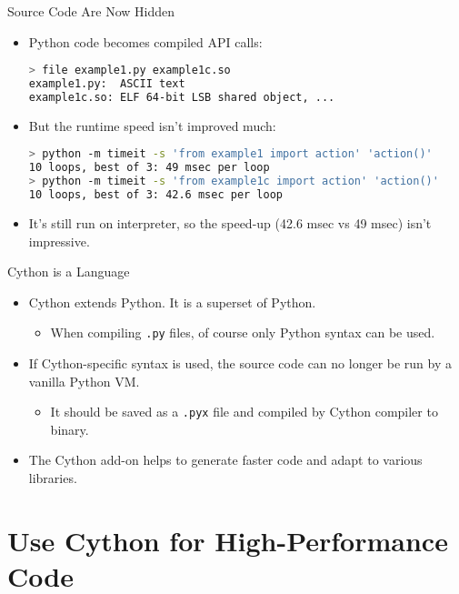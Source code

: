 \documentclass[dvips,xcolor=pst,14pt]{beamer}
\begin{document}
\begin{frame}[fragile]{
%
Source Code Are Now Hidden
%
}
\begin{itemize}
\item Python code becomes compiled API calls:
\begin{lstlisting}[language=bash]
> file example1.py example1c.so 
example1.py:  ASCII text
example1c.so: ELF 64-bit LSB shared object, ...
\end{lstlisting}
\item But the runtime speed isn't improved much:
\begin{lstlisting}[language=bash]
> python -m timeit -s 'from example1 import action' 'action()'
10 loops, best of 3: 49 msec per loop
> python -m timeit -s 'from example1c import action' 'action()'
10 loops, best of 3: 42.6 msec per loop
\end{lstlisting}
\item It's still run on interpreter, so the speed-up (42.6 msec vs 49 msec)
isn't impressive.
\end{itemize}
\end{frame}

\begin{frame}[fragile]{
%
Cython is a Language
%
}
\begin{itemize}
\item Cython extends Python.  It is a \alert{superset} of Python.
\begin{itemize}
\item When compiling {\color{red}\verb+.py+} files, of course only Python
syntax can be used.
\end{itemize}
\item If Cython-specific syntax is used, the source code can no longer be run
by a vanilla Python VM.
\begin{itemize}
\item It should be saved as a {\color{red}\verb+.pyx+} file and compiled by
Cython compiler to binary.
\end{itemize}
\item The Cython add-on helps to generate faster code and adapt to various
libraries.
\end{itemize}
\end{frame}

\section{
Use Cython for High-Performance Code
}
\end{document}
